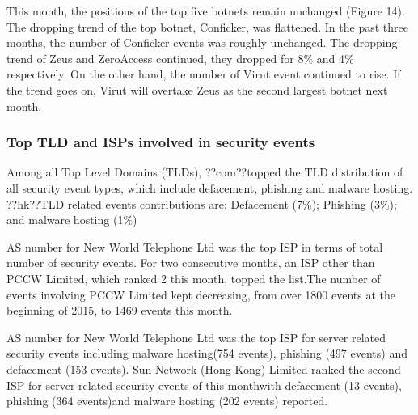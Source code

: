 \documentclass[11pt]{article}
\begin{document}
This month, the positions of the top five botnets remain unchanged (Figure 14).
The dropping trend of the top botnet, Conficker, was flattened. In the past three months, the number of Conficker events was roughly unchanged.
The dropping trend of Zeus and ZeroAccess continued, they dropped for 8\% and 4\% respectively. On the other hand, the number of Virut event continued to rise. If the trend goes on, Virut will overtake Zeus as the second largest botnet next month.
\FloatBarrier
\subsubsection*{Top TLD and ISPs involved in security events}
Among all Top Level Domains (TLDs), ??com??topped the TLD distribution of all security event types, which include defacement, phishing and malware hosting.
??hk??TLD related events contributions are: Defacement (7\%); Phishing (3\%); and malware hosting (1\%)

AS number for New World Telephone Ltd was the top ISP in terms of total number of security events. For two consecutive months, an ISP other than PCCW Limited, which ranked 2 this month, topped the list.The number of events involving PCCW Limited kept decreasing, from over 1800 events at the beginning of 2015, to 1469 events this month.

AS number for New World Telephone Ltd was the top ISP for server related security events including malware hosting(754 events), phishing (497 events) and defacement (153 events).
Sun Network (Hong Kong) Limited ranked the second ISP for server related security events of this monthwith defacement (13 events), phishing (364 events)and malware hosting (202 events) reported.
\pagebreak
\FloatBarrier
\end{document}
